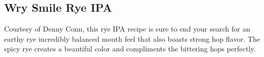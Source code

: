 \part{\stylegermanwheatandryebeer}

\chapter*{Wry Smile Rye IPA}

\begin{aboutblock}
Courtesy of Denny Conn, this rye IPA recipe is sure to end your search for
an earthy rye incredibly balanced mouth feel that also boasts strong hop flavor.
The spicy rye creates a beautiful color and compliments the bittering hops
perfectly. 
\end{aboutblock}


\begin{methodandtiming}

\begin{mashsteps}
\end{mashsteps}

\begin{fermentationsteps}
\end{fermentationsteps}

\end{methodandtiming}

\pagebreak

\begin{ingredientsblock}

\begin{malts}
\end{malts}

\begin{hops}
\end{hops}

\begin{yeasts}
\end{yeasts}

\end{ingredientsblock}
